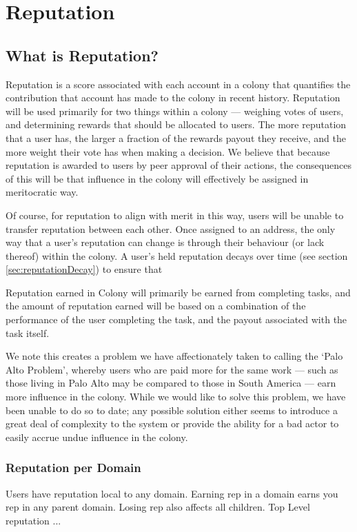 \section{Reputation}
\subsection{What is Reputation?}

Reputation is a score associated with each account in a colony that quantifies the contribution that account has made to the colony in recent history. Reputation will be used primarily for two things within a colony --- weighing votes of users, and determining rewards that should be allocated to users. The more reputation that a user has, the larger a fraction of the rewards payout they receive, and the more weight their vote has when making a decision. We believe that because reputation is awarded to users by peer approval of their actions, the consequences of this will be that influence in the colony will effectively be assigned in meritocratic way.

Of course, for reputation to align with merit in this way, users will be unable to transfer reputation between each other. Once assigned to an address, the only way that a user's reputation can change is through their behaviour (or lack thereof) within the colony. A user's held reputation decays over time (see section \ref{sec:reputationDecay}) to ensure that 


Reputation earned in Colony will primarily be earned from completing tasks, and the amount of reputation earned will be based on a combination of the performance of the user completing the task, and the payout associated with the task itself.

We note this creates a problem we have affectionately taken to calling the `Palo Alto Problem', whereby users who are paid more for the same work --- such as those living in Palo Alto may be compared to those in South America --- earn more influence in the colony. While we would like to solve this problem, we have been unable to do so to date; any possible solution either seems to introduce a great deal of complexity to the system or provide the ability for a bad actor to easily accrue undue influence in the colony.

\subsubsection{Reputation per Domain}
Users have reputation local to any domain. Earning rep in a domain earns you rep in any parent domain. Losing rep also affects all children.
Top Level reputation ...

